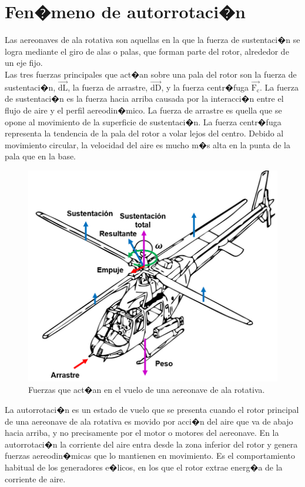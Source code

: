 \documentclass[10pt,a4paper]{book}
\author{Sa�l Becerril Ortega}
\begin{document}
\section*{Fen�meno de autorrotaci�n}
Las aereonaves de ala rotativa son aquellas en la que la fuerza de sustentaci�n se logra mediante el giro de alas o palas, que forman parte del rotor, alrededor de un eje fijo.\\
Las tres fuerzas principales que act�an sobre una pala del rotor son la fuerza de sustentaci�n, $\overrightarrow{\text{dL}}$, la fuerza de arrastre, $\overrightarrow{\text{dD}}$, y la fuerza centr�fuga $\overrightarrow{\text{F}_\text{c}}$. La fuerza de sustentaci�n es la fuerza hacia arriba causada por la interacci�n entre el flujo de aire y el perfil aereodin�mico. La fuerza de arrastre es quella que se opone al movimiento de la superficie de sustentaci�n. La fuerza centr�fuga representa la tendencia de la pala del rotor a volar  lejos del centro. Debido al movimiento circular, la velocidad del aire es mucho m�s alta en la punta de la pala que en la base.

\begin{figure}[H]
	\centering
		\includegraphics[scale=0.35]{Imagenes/Helicoptero.png}
	\caption{Fuerzas que act�an en el vuelo de una aereonave de ala rotativa.}
	\label{img:Helicoptero}
\end{figure}

La autorrotaci�n  es un estado de vuelo que se presenta cuando el rotor principal de una aereonave de ala rotativa es movido por acci�n del aire que va de abajo hacia arriba, y no precisamente por el motor o motores del aereonave. En la autorrotaci�n la corriente del aire entra desde la zona inferior del rotor y genera fuerzas aereodin�micas que lo mantienen en movimiento. Es el comportamiento habitual de los generadores e�licos, en los que el rotor extrae energ�a de la corriente de aire.
\end{document}
